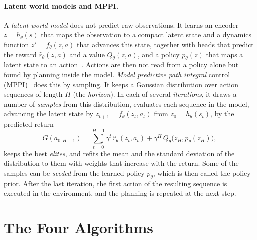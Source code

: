 \paragraph{Latent world models and MPPI.} A \emph{latent world model} does not predict raw observations.
It learns an encoder $z = h_{\theta}(s)$ that maps the observation to a compact latent state and a dynamics function $z' = f_{\theta}(z,a)$ that advances this state, together with heads that predict the reward $\hat{r}_{\theta}(z,a)$ and a value $Q_{\theta}(z,a)$, and a policy $p_{\theta}(z)$ that maps a latent state to an action~\cite{hansen2022tdmpc}.
Actions are then not read from a policy alone but found by planning inside the model.
\emph{Model predictive path integral} control (MPPI)~\cite{williams2017mppi} does this by sampling.
It keeps a Gaussian distribution over action sequences of length $H$ (the \emph{horizon}).
In each of several \emph{iterations}, it draws a number of \emph{samples} from this distribution, evaluates each sequence in the model, advancing the latent state by $z_{t+1} = f_{\theta}(z_t,a_t)$ from $z_0 = h_{\theta}(s_t)$, by the predicted return
\begin{equation}
  G(a_{0:H-1}) = \sum_{t=0}^{H-1} \gamma^{t}\,\hat{r}_{\theta}(z_t,a_t) + \gamma^{H}\,Q_{\theta}\bigl(z_H, p_{\theta}(z_H)\bigr),
  \label{eq:bg-mppi-score}
\end{equation}
keeps the best \emph{elites}, and refits the mean and the standard deviation of the distribution to them with weights that increase with the return.
Some of the samples can be \emph{seeded} from the learned policy $p_{\theta}$, which is then called the policy prior.
After the last iteration, the first action of the resulting sequence is executed in the environment, and the planning is repeated at the next step.


\section{The Four Algorithms}\label{sec:algos}

